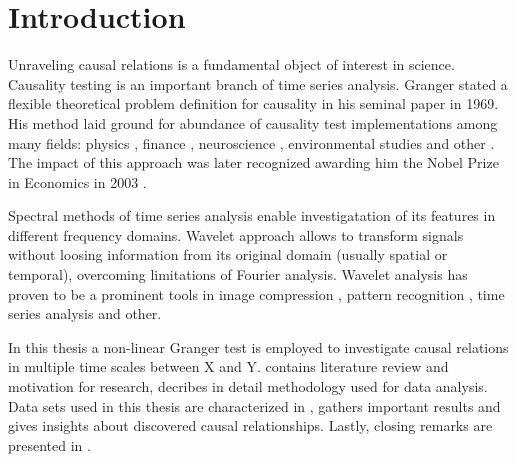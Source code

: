 \section{Introduction}

Unraveling causal relations is a fundamental object of interest in science.
Causality testing is an important branch of time series analysis.
Granger \cite{granger69} stated a flexible theoretical problem definition for causality in his seminal paper in 1969.
His method laid ground for abundance of causality test implementations among many fields:
physics \cite{inverse-ising,coupled-oscillators},
finance \cite{hiemstra-jones, gold-stock},
neuroscience \cite{Bullmore2009,causality-eeg,causality-visual},
environmental studies \cite{dogan2016co,ecological-economics}
and other \cite{social-media}.
The impact of this approach was later recognized awarding him the Nobel Prize in Economics in 2003 \cite{nobel2003}.

Spectral methods of time series analysis enable investigatation of its features in different frequency domains.
Wavelet approach allows to transform signals without loosing information from its original domain (usually spatial or temporal), overcoming limitations of Fourier analysis.
Wavelet analysis has proven to be a prominent tools in image compression \cite{jpeg2000}, 
pattern recognition \cite{pattern-recognition}, 
time series analysis \cite{multifractal-time-series} 
and other. %

In this thesis a non-linear Granger test is employed to investigate causal relations in multiple time scales between X and Y.
 contains literature review and motivation for research,
 decribes in detail methodology used for data analysis.
Data sets used in this thesis are characterized in ,
 gathers important results and gives insights about discovered causal relationships.
Lastly, closing remarks are presented in .
